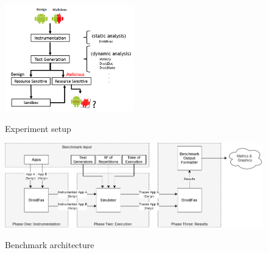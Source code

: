 \begin{figure}[h!]
  \includegraphics[width=0.5\textwidth]{images/setup.png}
  \label{Experiment setup}
  \caption{Experiment setup}
  \label{fig:setup}
\end{figure}

\begin{figure}[ht]
  \includegraphics[width=1\textwidth]{images/benchmark3.png}
  \label{benchArq}
  \caption{Benchmark architecture}
  \label{fig:benchArq}
\end{figure}
